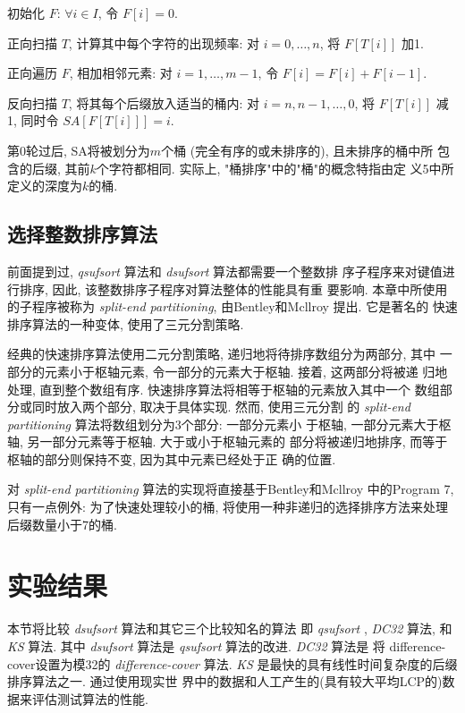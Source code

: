 \documentclass{ws-ijprai}
\begin{document}
\begin{arabiclist}
\item 初始化 $F$: $\forall i \in I$, 令 $F[i] = 0$.
\item 正向扫描 $T$, 计算其中每个字符的出现频率: 对 $i =
  0,\dots,n$, 将 $F[T[i]]$ 加1.
\item 正向遍历 $F$, 相加相邻元素: 对 $i = 1, \dots, m-1$, 令 $F[i] =
  F[i] + F[i-1]$.
\item 反向扫描 $T$, 将其每个后缀放入适当的桶内: 对 $i = n, n-1,\dots,
  0$, 将 $F[T[i]]$ 减1, 同时令 $SA[F[T[i]]] = i$.
\end{arabiclist}

第0轮过后, SA将被划分为$m$个桶 (完全有序的或未排序的), 且未排序的桶中所
包含的后缀, 其前$k$个字符都相同. 实际上, "桶排序"中的"桶"的概念特指由定
义5中所定义的深度为$k$的桶.

\subsection{选择整数排序算法}

前面提到过, \emph{qsufsort} 算法和 \emph{dsufsort} 算法都需要一个整数排
序子程序来对键值进行排序, 因此, 该整数排序子程序对算法整体的性能具有重
要影响. 本章中所使用的子程序被称为 \emph{split-end
  partitioning}, 由Bentley和Mcllroy\cite{Bentley1993} 提出. 它是著名的
快速排序算法\cite{Hoare1962}的一种变体, 使用了三元分割策略.

经典的快速排序算法使用二元分割策略, 递归地将待排序数组分为两部分, 其中
一部分的元素小于枢轴元素, 令一部分的元素大于枢轴. 接着, 这两部分将被递
归地处理, 直到整个数组有序. 快速排序算法将相等于枢轴的元素放入其中一个
数组部分或同时放入两个部分, 取决于具体实现. 然而, 使用三元分割
的 \emph{split-end partitioning} 算法将数组划分为3个部分: 一部分元素小
于枢轴, 一部分元素大于枢轴, 另一部分元素等于枢轴. 大于或小于枢轴元素的
部分将被递归地排序, 而等于枢轴的部分则保持不变, 因为其中元素已经处于正
确的位置.

对 \emph{split-end partitioning} 算法的实现将直接基于Bentley和Mcllroy
\cite{Bentley1993} 中的Program 7, 只有一点例外: 为了快速处理较小的桶,
将使用一种非递归的选择排序方法来处理后缀数量小于7的桶.

\section{实验结果}

本节将比较 \emph{dsufsort} 算法和其它三个比较知名的算法
即 \emph{qsufsort} \cite{Larsson2007},
\emph{DC32}\cite{Burkhardt2003} 算法, 和 \emph{KS} 算法\cite{Karkkainen2006}. 其中
\emph{dsufsort} 算法是 \emph{qsufsort} 算法的改进. \emph{DC32} 算法是
将 difference-cover设置为模32的 \emph{difference-cover} 算法.
\emph{KS} 是最快的具有线性时间复杂度的后缀排序算法之一. 通过使用现实世
界中的数据和人工产生的(具有较大平均LCP的)数据来评估测试算法的性能.
\end{document}
